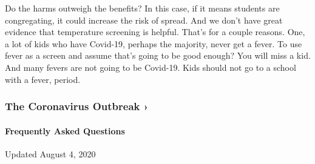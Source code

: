 Do the harms outweigh the benefits? In this case, if it means students
are congregating, it could increase the risk of spread. And we don't
have great evidence that temperature screening is helpful. That's for a
couple reasons. One, a lot of kids who have Covid-19, perhaps the
majority, never get a fever. To use fever as a screen and assume that's
going to be good enough? You will miss a kid. And many fevers are not
going to be Covid-19. Kids should not go to a school with a fever,
period.

\href{https://www.nytimes.com/news-event/coronavirus?action=click\&pgtype=Article\&state=default\&region=MAIN_CONTENT_3\&context=storylines_faq}{}

\hypertarget{the-coronavirus-outbreak-}{%
\subsubsection{The Coronavirus Outbreak
›}\label{the-coronavirus-outbreak-}}

\hypertarget{frequently-asked-questions}{%
\paragraph{Frequently Asked
Questions}\label{frequently-asked-questions}}

Updated August 4, 2020

